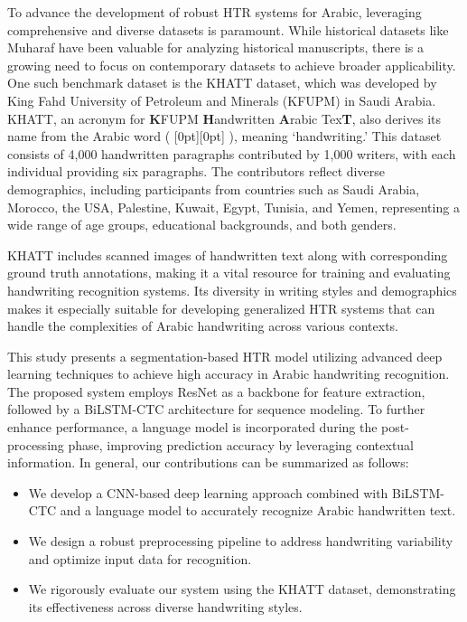 \documentclass[conference]{IEEEtran}
\newcommand{\artext}[1]{%
  {\fontsize{8pt}{11pt}\selectfont \raisebox{0pt}[0pt][0pt]{\RL{#1}}}%
}
\begin{document}
To advance the development of robust HTR systems for Arabic, leveraging comprehensive and diverse datasets is paramount. While historical datasets like Muharaf \cite{saeed2024muharaf} have been valuable for analyzing historical manuscripts, there is a growing need to focus on contemporary datasets to achieve broader applicability. One such benchmark dataset is the KHATT \cite{mahmoud2012khatt,mahmoud2014khatt} dataset, which was developed by King Fahd University of Petroleum and Minerals (KFUPM) in Saudi Arabia. KHATT, an acronym for \textbf{K}FUPM \textbf{H}andwritten \textbf{A}rabic Tex\textbf{T}, also derives its name from the Arabic word (\artext{خط}), meaning ‘handwriting.’ This dataset consists of 4,000 handwritten paragraphs contributed by 1,000 writers, with each individual providing six paragraphs. The contributors reflect diverse demographics, including participants from countries such as Saudi Arabia, Morocco, the USA, Palestine, Kuwait, Egypt, Tunisia, and Yemen, representing a wide range of age groups, educational backgrounds, and both genders.

KHATT includes scanned images of handwritten text along with corresponding ground truth annotations, making it a vital resource for training and evaluating handwriting recognition systems. Its diversity in writing styles and demographics makes it especially suitable for developing generalized HTR systems that can handle the complexities of Arabic handwriting across various contexts. 


This study presents a segmentation-based HTR model utilizing advanced deep learning techniques to achieve high accuracy in Arabic handwriting recognition. The proposed system employs ResNet as a backbone for feature extraction, followed by a BiLSTM-CTC architecture for sequence modeling. To further enhance performance, a language model is incorporated during the post-processing phase, improving prediction accuracy by leveraging contextual information. In general, our contributions can be summarized as follows:


\begin{itemize}
    \item We develop a CNN-based deep learning approach combined with BiLSTM-CTC and a language model to accurately recognize Arabic handwritten text.
    \item We design a robust preprocessing pipeline to address handwriting variability and optimize input data for recognition.
    \item We rigorously evaluate our system using the KHATT dataset, demonstrating its effectiveness across diverse handwriting styles.
\end{itemize}
\end{document}
